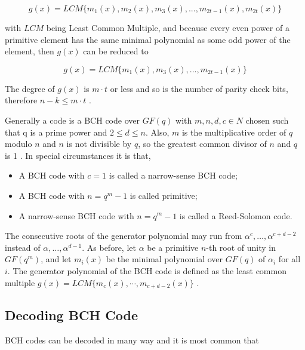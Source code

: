\documentclass[../main.tex]{subfiles}
\begin{document}
    \begin{equation*}
        g(x) = LCM \{m_1(x), m_2(x), m_3(x), ..., m_{2t-1}(x), m_{2t}(x)\}
    \end{equation*}

    \noindent
    with $LCM$ being Least Common Multiple, and because every even power of a primitive element has the same minimal polynomial as some odd power of the element, then $g(x)$ can be reduced to

    \begin{equation*}
        g(x) = LCM \{m_1(x), m_3(x), ..., m_{2t-1}(x)\}
    \end{equation*}

    \noindent
    The degree of $g(x)$ is $m \cdot t$ or less and so is the number of parity check bits, therefore $n-k \leq m \cdot t$ \autocite{lint1999introduction}.

    Generally a code is a BCH code over $GF (q )$ with $m , n , d , c \in N$ chosen such that q is a prime power and $2 \leq d \leq n$. Also, $m$ is the multiplicative order of $q$ modulo $n$ and $n$ is not divisible by $q$, so the greatest common divisor of $n$ and $q$ is 1 \autocite{lidl1998applied}. In special circumstances it is that,

    \begin{itemize}
        \item A BCH code with $c=1$ is called a narrow-sense BCH code;
        \item A BCH code with $n = q^m-1$ is called primitive;
        \item A narrow-sense BCH code with $n = q^m-1$ is called a Reed-Solomon code.
    \end{itemize}

    The consecutive roots of the generator polynomial may run from $\alpha^c, \dots, \alpha^{c+d-2}$ instead of $\alpha, \dots, \alpha^{d-1}$. As before, let $\alpha$ be a primitive $n$-th root of unity in $GF(q^m)$, and let $m_i(x)$ be the minimal polynomial over $GF(q)$ of $\alpha_i$ for all $i$. The generator polynomial of the BCH code is defined as the least common multiple $g(x) = LCM \{m_c(x), \cdots, m_{c+d-2}(x)\}$ \autocite{trappe2006introduction}.


    \subsection{Decoding BCH Code}

    BCH codes can be decoded in many way and it is most common that
\end{document}
